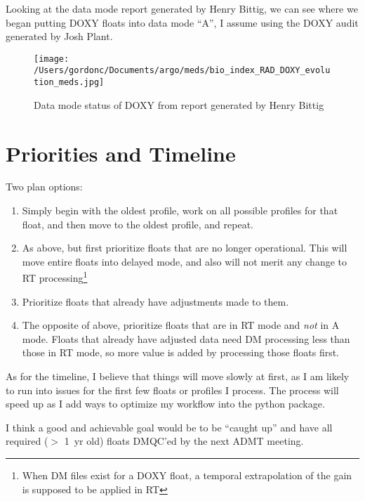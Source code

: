 \documentclass[11pt,english]{article} %
\begin{document}
Looking at the data mode report generated by Henry Bittig, we can see where we
began putting DOXY floats into data mode ``A'', I assume using the DOXY audit
generated by Josh Plant. 

\begin{figure}[H]
    \centering
    \texttt{[image: /Users/gordonc/Documents/argo/meds/bio\_index\_RAD\_DOXY\_evolution\_meds.jpg]}
    \caption{Data mode status of DOXY from report generated by Henry Bittig}
\end{figure}

\section{Priorities and Timeline} \label{s:plan}

Two plan options:

\begin{enumerate}

    \item[1 (a)] Simply begin with the oldest profile, work on all possible
    profiles for that float, and then move to the oldest profile, and repeat.
    \item[1 (b)] As above, but first prioritize floats that are no longer
    operational. This will move entire floats into delayed mode, and also
    will not merit any change to RT processing\footnote{When DM files exist
    for a DOXY float, a temporal extrapolation of the gain is supposed to
    be applied in RT}
    \item[2 (a)] Prioritize floats that already have adjustments made to them. 
    \item[2 (b)] The opposite of above, prioritize floats that are in RT mode
    and \emph{not} in A mode. Floats that already have adjusted data need DM
    processing less than those in RT mode, so more value is added by processing
    those floats first.

\end{enumerate}

As for the timeline, I believe that things will move slowly at first, as I am
likely to run into issues for the first few floats or profiles I process. The
process will speed up as I add ways to optimize my workflow into the python 
package. 

I think a good and achievable goal would be to be ``caught up'' and have all
required ($>$ 1~yr old) floats DMQC'ed by the next ADMT meeting. 
\end{document}

